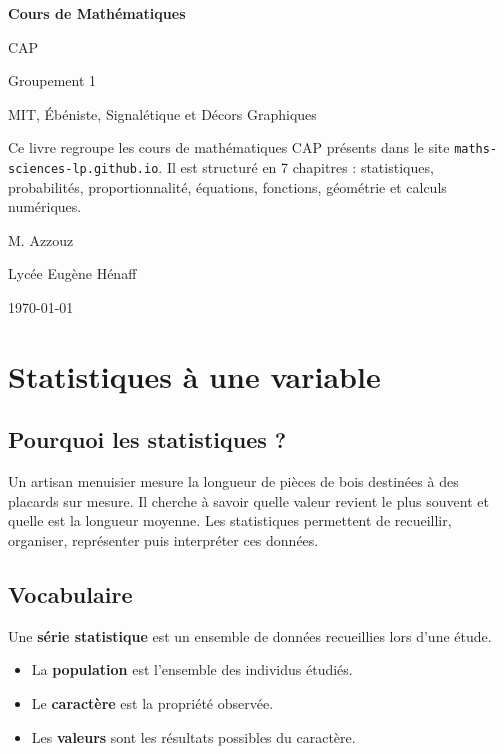 \documentclass[11pt,a4paper,twoside]{book}
\begin{document}
\begin{titlepage}
\centering
\vspace*{2.5cm}
{\Huge\bfseries Cours de Mathématiques\par}
\vspace{0.4cm}
{\LARGE CAP\par}
\vspace{0.4cm}
{\Large Groupement 1\par}
\vspace{1.5cm}
{\large MIT, Ébéniste, Signalétique et Décors Graphiques\par}
\vspace{2cm}
\begin{tcolorbox}[colback=caplight,colframe=capbrown,width=.85\textwidth]
Ce livre regroupe les cours de mathématiques CAP présents dans le site
\texttt{maths-sciences-lp.github.io}. Il est structuré en 7 chapitres :
statistiques, probabilités, proportionnalité, équations, fonctions,
géométrie et calculs numériques.
\end{tcolorbox}
\vfill
{\large M. Azzouz\par}
{\large Lycée Eugène Hénaff\par}
\vspace{0.5cm}
{\large \today\par}
\end{titlepage}

\frontmatter
\tableofcontents

\mainmatter

\chapter{Statistiques à une variable}

\section{Pourquoi les statistiques ?}
\begin{exemplebox}
Un artisan menuisier mesure la longueur de pièces de bois destinées à des placards sur mesure.
Il cherche à savoir quelle valeur revient le plus souvent et quelle est la longueur moyenne.
Les statistiques permettent de recueillir, organiser, représenter puis interpréter ces données.
\end{exemplebox}

\section{Vocabulaire}
\begin{definitionbox}
Une \textbf{série statistique} est un ensemble de données recueillies lors d'une étude.
\begin{itemize}
\item La \textbf{population} est l'ensemble des individus étudiés.
\item Le \textbf{caractère} est la propriété observée.
\item Les \textbf{valeurs} sont les résultats possibles du caractère.
\end{itemize}
\end{definitionbox}
\end{document}

